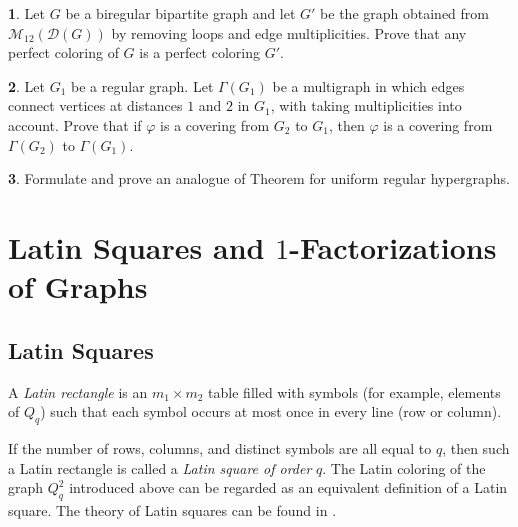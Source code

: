\documentclass[11pt]{article}
\theoremstyle{definition}
\newtheorem{exercise}{\quad}
\begin{document}
{{{\begin{exercise}
Let $G$ be a biregular bipartite graph and let $G'$ be the graph obtained from
$\mathcal{M}_{12}(\mathcal{D}(G))$ by removing loops and edge multiplicities. 
Prove that  any perfect coloring of $G$ is 
  a perfect coloring $G'$.
\end{exercise}

\begin{exercise}
Let $G_1$ be a regular graph.  Let  $\Gamma(G_1)$ be a multigraph  in which
edges connect vertices at distances $1$ and $2$ in $G_1$, with taking multiplicities into account. Prove that if $\varphi$ is a covering
from $G_2$ to $G_1$, then $\varphi$ is a covering
from $\Gamma(G_2)$ to $\Gamma(G_1)$.
\end{exercise}

\begin{exercise}
Formulate and prove an analogue of Theorem 
\label{thAF} for uniform regular hypergraphs.
\end{exercise}
\section{Latin Squares and $1$-Factorizations of Graphs}

\subsection{Latin Squares}

A {\sl  Latin rectangle} is an  $m_1\times m_2$ table
filled with symbols (for example, elements of $Q_q$) such that each symbol occurs at most once in
every line (row or column). 

If the number of rows, columns, and distinct symbols are  all equal to $q$, then such
a Latin rectangle is called a {\sl Latin square of order} $q$.
The Latin coloring of the graph $Q^2_q$ introduced above can be
regarded as an equivalent definition of a Latin
square. The theory of Latin squares can be found in
\cite{DenesK}.

}}}
\end{document}
